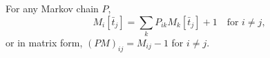For any Markov chain $P$,
$$M_i[\bar{t}_j] = \sum_k P_{ik} M_k[\bar{t}_j] + 1 \quad \text{for } i \neq j,$$
or in matrix form, $(P M)_{ij} = M_{ij} - 1$ for $i \neq j$.
